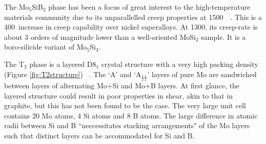 The Mo$_5$SiB$_2$ phase has been a focus of great interest to the high-temperature materials community due to its unparallelled creep properties at 1500\celsius\ ~\cite{hayashi04, ito01}.  This is a 400\celsius\ increase in creep capability over nickel superalloys.  At 1300\celsius, its creep-rate is about 3 orders of magnitude lower than a well-oriented MoSi$_2$ sample.  It is a boro-silicide variant of Mo$_5$Si$_3$.

The T$_2$ phase is a layered D8$_1$ crystal structure with a very high packing density (Figure \ref{fig:T2structure}) ~\cite{rawn01, sakidja08}.  The `A' and `A$_{\frac{1}{2}\frac{1}{2}}$' layers of pure Mo are sandwiched between layers of alternating Mo+Si and Mo+B layers.  At first glance, the layered structure could result in poor properties in shear, akin to that in graphite, but this has not been found to be the case.  The very large unit cell contains 20 Mo atoms, 4 Si atoms and 8 B atoms.  The large difference in atomic radii between Si and B ``neccessitates stacking arrangements" of the Mo layers such that distinct layers can be accommodated for Si and B.  


